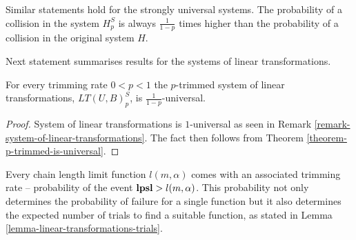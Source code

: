 Similar statements hold for the strongly universal systems. The probability of a collision in the system $H_p^S$ is always $\frac{1}{1 - p}$ times higher than the probability of a collision in the original system $H$.

Next statement summarises results for the systems of linear transformations.

\begin{corollary}
\label{corollary-trimming-linear}
For every trimming rate $0 < p < 1$ the $p$-trimmed system of linear transformations, $LT(U, B)_p^S$, is $\frac{1}{1 - p}$-universal.
\end{corollary}
\begin{proof}
System of linear transformations is $1$-universal as seen in Remark \ref{remark-system-of-linear-transformations}. The fact then follows from  Theorem \ref{theorem-p-trimmed-is-universal}.
\end{proof}

Every chain length limit function $l(m, \alpha)$ comes with an associated trimming rate -- probability of the event $\mathbf{lpsl} > l(m, \alpha)$.  This probability not only determines the probability of failure for a single function but it also determines the expected number of trials to find a suitable function, as stated in Lemma \ref{lemma-linear-transformations-trials}. 

